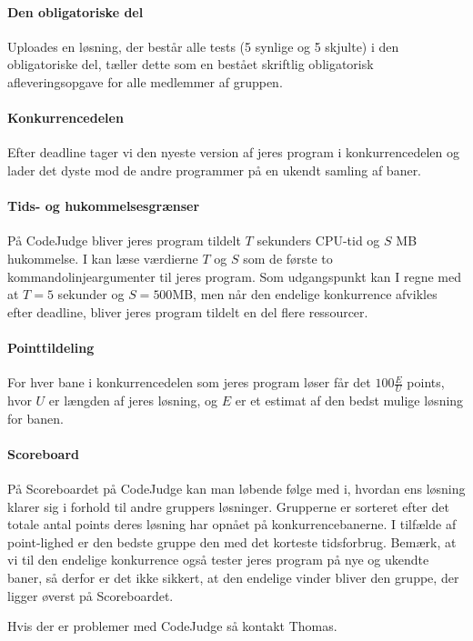 \documentclass[10pt, a4paper]{article}
\begin{document}
\paragraph{Den obligatoriske del} Uploades en løsning, der består alle tests (5 synlige og 5 skjulte) i den obligatoriske del, tæller dette som en bestået skriftlig obligatorisk afleveringsopgave for alle medlemmer af gruppen.

\paragraph{Konkurrencedelen} Efter deadline tager vi den nyeste version af jeres program i konkurrencedelen og lader det dyste mod de andre programmer på en ukendt samling af baner.

\paragraph{Tids- og hukommelsesgrænser} På CodeJudge bliver jeres program tildelt $T$ sekunders CPU-tid og $S$ MB hukommelse. I kan læse værdierne $T$ og $S$ som de første to kommandolinjeargumenter til jeres program. Som udgangspunkt kan I regne med at $T=5$ sekunder og $S=500$MB, men når den endelige konkurrence afvikles efter deadline, bliver jeres program tildelt en del flere ressourcer.

\paragraph{Pointtildeling} For hver bane i konkurrencedelen som jeres program løser får det $100 \frac{E}{U}$ points, hvor $U$ er længden af jeres løsning, og $E$ er et estimat af den bedst mulige løsning for banen.

\paragraph{Scoreboard} På Scoreboardet på CodeJudge kan man løbende følge med i, hvordan ens løsning klarer sig i forhold til andre gruppers løsninger.
Grupperne er sorteret efter det totale antal points deres løsning har opnået på konkurrencebanerne.
I tilfælde af point-lighed er den bedste gruppe den med det korteste tidsforbrug.
Bemærk, at vi til den endelige konkurrence også tester jeres program på nye og ukendte baner, så derfor er det ikke sikkert, at den endelige vinder bliver den gruppe, der ligger øverst på Scoreboardet.

\noindent Hvis der er problemer med CodeJudge så kontakt Thomas.
\end{document}
